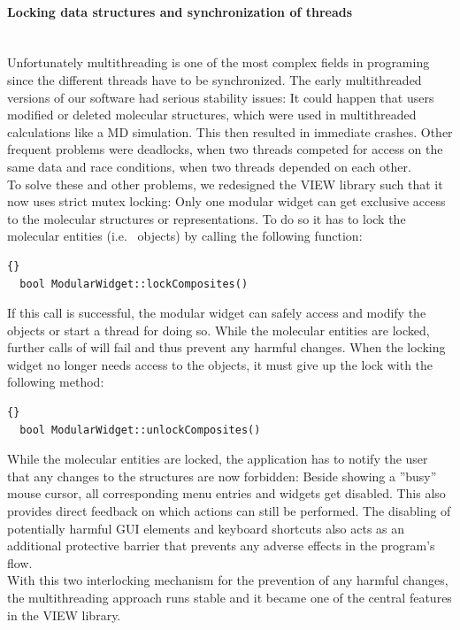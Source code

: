 \paragraph{Locking data structures and synchronization of threads}
\hspace*{\fill}\\
Unfortunately multithreading is one of the most complex fields in programing since the different 
threads have to be synchronized.
The early multithreaded versions of our software had serious stability issues: It could \eg happen
that users modified or deleted molecular structures, which were used in multithreaded calculations 
like a MD simulation. This then resulted in immediate crashes. Other frequent problems were deadlocks,
when two threads competed for access on the same data and race conditions, when two threads depended on each other.\\
To solve these and other problems, we redesigned the VIEW library such that it now uses strict mutex locking:
Only one modular widget can get exclusive access to the molecular structures or representations.
To do so it has to lock the molecular entities (i.e.\  objects) by calling the following function:
\begin{lstlisting}{}
  bool ModularWidget::lockComposites()
\end{lstlisting}
If this call is successful, the modular widget can safely access and modify the  objects or
start a thread for doing so. While the molecular entities are locked, further calls of  will
fail and thus prevent any harmful changes. When the locking widget no longer needs access to the  objects,
it must give up the lock with the following method:
\begin{lstlisting}{}
  bool ModularWidget::unlockComposites()
\end{lstlisting}

\vspace{0.5cm}

While the molecular entities are locked, the application has to notify the user that any changes to the structures are now forbidden:
Beside showing a ''busy'' mouse cursor, all corresponding menu entries and widgets get disabled. This also provides direct
feedback on which actions can still be performed. The disabling of potentially harmful GUI elements and keyboard shortcuts also
acts as an additional protective barrier that prevents any adverse effects in the program's flow.
\\
With this two interlocking mechanism for the prevention of any harmful changes, the multithreading approach runs stable
and it became one of the central features in the VIEW library.

